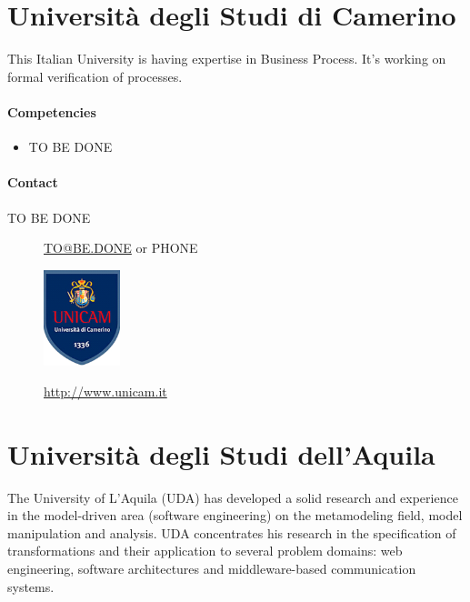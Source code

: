 \documentclass{learnpad}
\begin{document}
\section{Università degli Studi di Camerino}
This Italian University is having expertise in Business Process.  It's working
on formal verification of processes.

\paragraph{Competencies}
\begin{itemize}
	\item TO BE DONE
\end{itemize}

\paragraph{Contact}
\begin{description}
	\item[TO BE DONE] \href{mailto:TO@BE.DONE}{TO@BE.DONE} or PHONE
\end{description}

\begin{figure}[!htp]
	\centering
	\includegraphics[width=6em,keepaspectratio]{figures/unicam.png}\par
	\url{http://www.unicam.it}
\end{figure}

\section{Università degli Studi dell'Aquila}
The University of L’Aquila (UDA) has developed a solid research and experience
in the model-driven area (software engineering) on the metamodeling field, model
manipulation and analysis.  UDA concentrates his research in the specification
of transformations and their application to several problem domains: web
engineering, software architectures and middleware-based communication systems.
\end{document}
